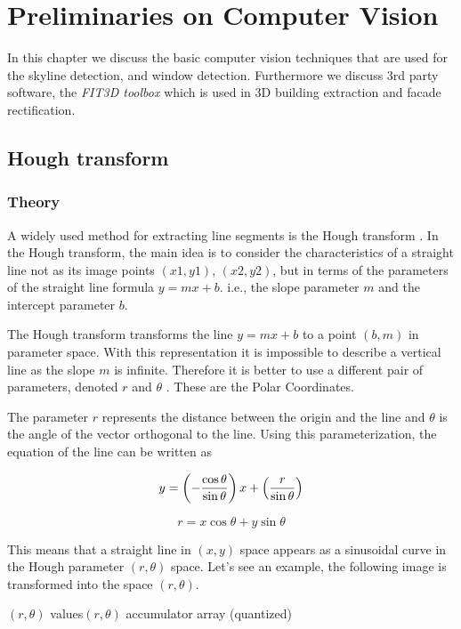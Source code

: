 \section{Preliminaries on Computer Vision}
\label{sec:ch2}
In this chapter we discuss the basic computer vision techniques that are used for
the skyline detection, and window detection.  Furthermore we discuss 3rd
party software, the \emph{FIT3D toolbox} \cite{FIT3D} which is used in 3D building extraction and facade rectification.

\subsection{Hough transform}
\label{sec:prelimHough}
\subsubsection{Theory}
	A widely used method for extracting line segments is the Hough transform
	\cite{Hough}.
	In the Hough transform, the main idea is to consider the characteristics of a
	straight line not as its image points $(x1, y1)$, $(x2, y2)$, but in
	terms of the parameters of the straight line formula $y = mx + b$. i.e., the
	slope parameter $m$ and the intercept parameter $b$.


	The Hough transform transforms the line $y = mx + b$ 
	to a point $(b,m)$ in parameter space.
	With this representation it is impossible to describe a vertical line as 
	the slope $m$ is infinite.
	Therefore it is better to use a different pair of parameters, denoted $r$ and $\theta$ .  These are the Polar Coordinates.

	The parameter $r$ represents the distance between the origin and the line  and $\theta$ is the angle of the vector orthogonal to the line.
	Using this parameterization, the equation of the line can be written as

\[	    y = \left(-{\cos\theta\over\sin\theta}\right)x + \left({r\over{\sin\theta}}\right) \]

	\[r = x \cos \theta+y\sin \theta \]
	
	This means that a straight line in $(x,y)$ space appears as a sinusoidal
	curve in the Hough parameter $(r,\theta)$ space.  Let's see an example, the
	following image is transformed into the space $(r,\theta)$.
	
	 {$(r, \theta)$ values}{$(r, \theta)$ accumulator array (quantized)}

